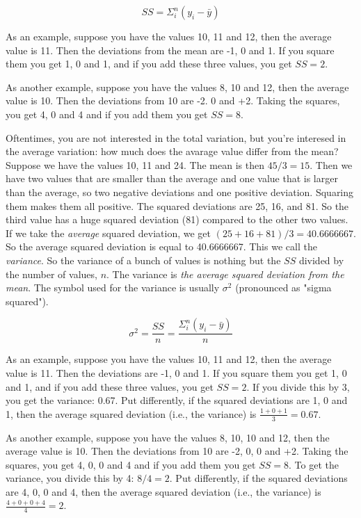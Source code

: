 \documentclass[]{report}\usepackage[]{graphicx}\usepackage[]{color}
\begin{document}
\begin{equation}
SS = \Sigma_i^n (y_i-\bar{y})
\end{equation}

As an example, suppose you have the values 10, 11 and 12, then the average value is 11. Then the deviations from the mean are -1, 0 and 1. If you square them you get 1, 0 and 1, and if you add these three values, you get $SS=2$.

As another example, suppose you have the values 8, 10 and 12, then the average value is 10. Then the deviations from 10 are -2. 0 and +2. Taking the squares, you get 4, 0 and 4 and if you add them you get $SS=8$.

Oftentimes, you are not interested in the total variation, but you're interesed in the average variation: how much does the avarage value differ from the mean? Suppose we have the values 10, 11 and 24. The mean is then $45/3=15$. Then we have two values that are smaller than the average and one value that is larger than the average, so two negative deviations and one positive deviation. Squaring them makes them all positive. The squared deviations are 25, 16, and 81. So the third value has a huge squared deviation (81) compared to the other two values. If we take the \textit{average} squared deviation, we get $(25+16+81)/3= 40.6666667$. So the average squared deviation is equal to 40.6666667. This we call the \textit{variance}. So the variance of a bunch of values is nothing but the $SS$ divided by the number of values, $n$. The variance is \textit{the average squared deviation from the mean}. The symbol used for the variance is usually $\sigma^2$ (pronounced as "sigma squared").

\begin{equation}
\sigma^2 = \frac{SS}{n}= \frac{\Sigma_i^n (y_i-\bar{y})}{n}
\end{equation}


As an example, suppose you have the values 10, 11 and 12, then the average value is 11. Then the deviations are -1, 0 and 1. If you square them you get 1, 0 and 1, and if you add these three values, you get $SS=2$. If you divide this by 3, you get the variance: 0.67. Put differently, if the squared deviations are 1, 0 and 1, then the average squared deviation (i.e., the variance) is $\frac{1+0+1}{3}=0.67$.

As another example, suppose you have the values 8, 10, 10 and 12, then the average value is 10. Then the deviations from 10 are -2, 0, 0 and +2. Taking the squares, you get 4, 0, 0 and 4 and if you add them you get $SS=8$. To get the variance, you divide this by 4: $8/4=2$. Put differently, if the squared deviations are 4, 0, 0 and 4, then the average squared deviation (i.e., the variance) is $\frac{4+0+0+4}{4}=2$.
\end{document}
